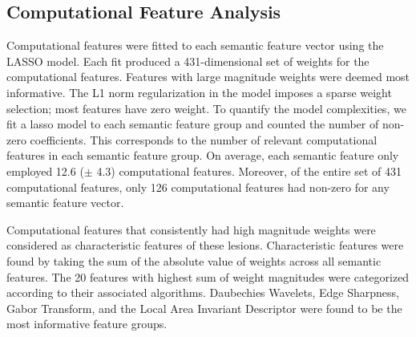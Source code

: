 \subsection{Computational Feature Analysis}
Computational features were fitted to each semantic feature vector using the LASSO model. Each fit produced a 431-dimensional set of weights for the computational features. Features with large magnitude weights were deemed most informative.  The L1 norm regularization in the model imposes a sparse weight selection; most features have zero weight. To quantify the model complexities, we fit a lasso model to each semantic feature group and counted the number of non-zero coefficients. This corresponds to the number of relevant computational features in each semantic feature group. On average, each semantic feature only employed 12.6 ($\pm$ 4.3) computational features. Moreover, of the entire set of 431 computational features, only 126 computational features had non-zero for any semantic feature vector.

Computational features that consistently had high magnitude weights were considered as characteristic features of these lesions. Characteristic features were found by taking the sum of the absolute value of weights across all semantic features. The 20 features with highest sum of weight magnitudes were categorized according to their associated algorithms. Daubechies Wavelets, Edge Sharpness, Gabor Transform, and the Local Area Invariant Descriptor were found to be the most informative feature groups.
